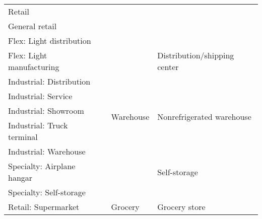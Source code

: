 \begin{table}
\begin{tabular}{|p{4.25cm}|p{3.5cm}|p{3.25cm}|p{4.25cm}|}
Retail                                                &                                                 &                                           &                                                 \\ \cline{1-1}
General retail                                        &                                                 &                                           &                                                 \\ \cline{1-1} \cline{3-4}
Flex: Light distribution                              &                                                 & \multirow{9}{*}{Warehouse}                & \multirow{3}{*}{Distribution/shipping center}   \\ \cline{1-1}
Flex: Light manufacturing                             &                                                 &                                           &                                                 \\ \cline{1-1}
Industrial: Distribution                              &                                                 &                                           &                                                 \\ \cline{1-1} \cline{4-4}
Industrial: Service                                   &                                                 &                                           & \multirow{3}{*}{Nonrefrigerated warehouse}     \\ \cline{1-1}
Industrial: Showroom                                  &                                                 &                                           &                                                 \\ \cline{1-1}
Industrial: Truck terminal                            &                                                 &                                           &                                                 \\ \cline{1-1} \cline{4-4}
Industrial: Warehouse                                 &                                                 &                                           & \multirow{3}{*}{Self-storage}                   \\ \cline{1-1}
Specialty: Airplane hangar                            &                                                 &                                           &                                                 \\ \cline{1-1}
Specialty: Self-storage                               &                                                 &                                           &                                                 \\ \hline
Retail: Supermarket                                   &                                                 & Grocery                                   & Grocery store                                   \\ \hline
\end{tabular}
\end{table}
